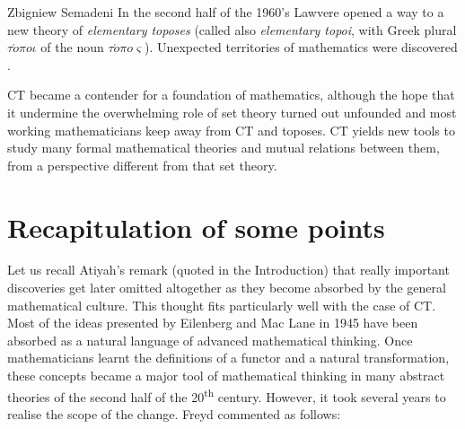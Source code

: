 \begin{artengenv}{Zbigniew Semadeni}
In the second half of the 1960's Lawvere opened a way to a new theory of \textit{elementary 
toposes} (called also \textit{elementary topoi}, with Greek plural 
$\tau{\acute{o}}\pi o\iota$ of the noun $\tau{\acute{o}}\pi o\varsigma$). 
Unexpected territories of mathematics were discovered \parencites[][]{Law-Toposes}[][pp.352--359]{Century}[][]{Kromer}. 

CT became a contender for a foundation of mathematics, although the hope that it 
undermine the overwhelming role of set theory turned out unfounded and most 
working mathematicians keep away from CT and toposes. CT yields new tools to study 
many formal mathematical theories and mutual relations between them, from a 
perspective different from that set theory.  

\section{Recapitulation of some points}  
Let us recall Atiyah's remark (quoted in the Introduction) that really important 
discoveries get later omitted altogether as they become absorbed by the general 
mathematical culture. This thought fits particularly well with the case of CT. Most 
of the ideas presented by Eilenberg and Mac Lane in 1945 have been absorbed as a 
natural language of advanced mathematical thinking. Once mathematicians learnt the 
definitions of a functor and a natural transformation, these concepts became a 
major tool of mathematical thinking in many abstract theories of the second half 
of the 20\textsuperscript{th} century. However, it took several years to realise the scope of the 
change. Freyd commented as follows: 



\end{artengenv}

